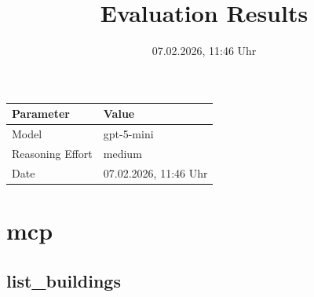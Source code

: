 \documentclass[a4paper,11pt]{article}
\title{Evaluation Results}
\date{07.02.2026, 11:46 Uhr}
\begin{document}
\maketitle

\begin{table}[H]
\centering
\begin{tabular}{l l}
\toprule
\textbf{Parameter} & \textbf{Value} \\
\midrule
Model & gpt-5-mini \\
Reasoning Effort & medium \\
Date & 07.02.2026, 11:46 Uhr \\
\bottomrule
\end{tabular}
\end{table}

\tableofcontents
\clearpage

\section{mcp}

\subsection{list\_buildings}
\end{document}
